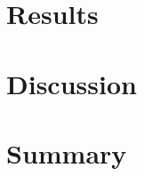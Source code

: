 \section{Results}
\label{sec:<id>-results}

\section{Discussion}
\label{sec:<id>-discussion}

\section{Summary}
\label{sec:<id>-summary}

%
%   
%
